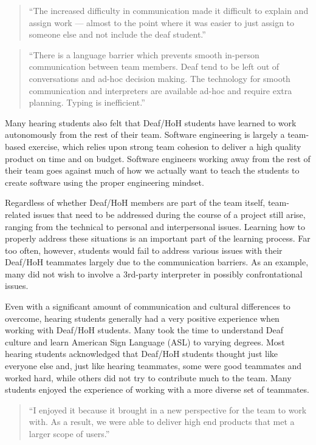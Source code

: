 \documentclass[conference]{IEEEtran}
\begin{document}
\begin{quotation}
``The increased difficulty in communication made it difficult to explain and assign work --- almost to the point where it was easier to just assign to someone else and not include the deaf student.''
\end{quotation}

\begin{quotation}
``There is a language barrier which prevents smooth in-person communication between team members. Deaf tend to be left out of conversations and ad-hoc decision making. The technology for smooth communication and interpreters are available ad-hoc and require extra planning. Typing is inefficient.''
\end{quotation}

Many hearing students also felt that Deaf/HoH students have learned to work autonomously from the rest of their team. Software engineering is largely a team-based exercise, which relies upon strong team cohesion to deliver a high quality product on time and on budget. Software engineers working away from the rest of their team goes against much of how we actually want to teach the students to create software using the proper engineering mindset.

Regardless of whether Deaf/HoH members are part of the team itself, team-related issues that need to be addressed during the course of a project still arise, ranging from the technical to personal and interpersonal issues. Learning how to properly address these situations is an important part of the learning process. Far too often, however, students would fail to address various issues with their Deaf/HoH teammates largely due to the communication barriers. As an example, many did not wish to involve a 3rd-party interpreter in possibly confrontational issues.

Even with a significant amount of communication and cultural differences to overcome, hearing students generally had a very positive experience when working with Deaf/HoH students. Many took the time to understand Deaf culture and learn American Sign Language (ASL) to varying degrees. Most hearing students acknowledged that Deaf/HoH students thought just like everyone else and, just like hearing teammates, some were good teammates and worked hard, while others did not try to contribute much to the team. Many students enjoyed the experience of working with a more diverse set of teammates.

\begin{quotation}
``I enjoyed it because it brought in a new perspective for the team to work with.  As a result, we were able to deliver high end products that met a larger scope of users.''
\end{quotation}
\end{document}
